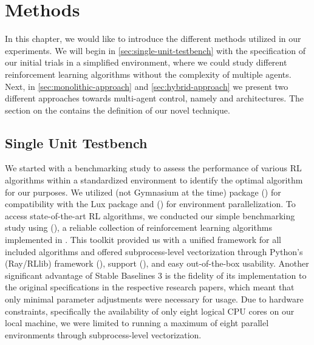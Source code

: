 \chapter{Methods}
\label{ch:meth}

\noindent In this chapter, we would like to introduce the different methods utilized in our experiments. We will begin in \autoref{sec:single-unit-testbench} with the specification of our initial trials in a simplified  environment, where we could study different reinforcement learning algorithms without the complexity of multiple agents. Next, in \autoref{sec:monolithic-approach} and \autoref{sec:hybrid-approach} we present two different approaches towards multi-agent control, namely  and  architectures. The section on the  contains the definition of our novel  technique.

\section{Single Unit Testbench}
\label{sec:single-unit-testbench}

\noindent We started with a benchmarking study to assess the performance of various RL algorithms within a standardized environment to identify the optimal algorithm for our purposes. We utilized  (not Gymnasium at the time) package (\textcolor{deepblue}{\cite{1606.01540}}) for compatibility with the Lux package and  (\textcolor{deepblue}{\cite{terry2021pettingzoo}}) for environment parallelization. To access state-of-the-art RL algorithms, we conducted our simple benchmarking study using  (\textcolor{deepblue}{\cite{stable-baselines3}}), a reliable collection of reinforcement learning algorithms implemented in . This toolkit provided us with a unified framework for all included algorithms and offered subprocess-level vectorization through Python's  (Ray/RLlib) framework (\textcolor{deepblue}{\cite{moritz2018ray}}),  support (\textcolor{deepblue}{\cite{abadi2016tensorflow}}), and easy out-of-the-box usability. Another significant advantage of Stable Baselines 3 is the fidelity of its implementation to the original specifications in the respective research papers, which meant that only minimal parameter adjustments were necessary for usage. Due to hardware constraints, specifically the availability of only eight logical CPU cores on our local machine, we were limited to running a maximum of eight parallel environments through subprocess-level vectorization.


